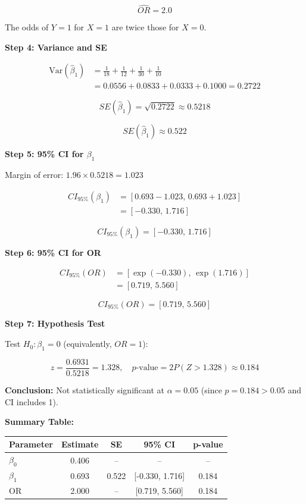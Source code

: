 \begin{solution}
\[
\boxed{\widehat{OR} = 2.0}
\]

The odds of $Y=1$ for $X=1$ are twice those for $X=0$.

\textbf{Step 4: Variance and SE}

\begin{align*}
\text{Var}(\hat{\beta}_1) &= \frac{1}{18} + \frac{1}{12} + \frac{1}{30} + \frac{1}{10} \\
&= 0.0556 + 0.0833 + 0.0333 + 0.1000 = 0.2722
\end{align*}

\[
SE(\hat{\beta}_1) = \sqrt{0.2722} \approx 0.5218
\]

\[
\boxed{SE(\hat{\beta}_1) \approx 0.522}
\]

\textbf{Step 5: 95\% CI for $\beta_1$}

Margin of error: $1.96 \times 0.5218 = 1.023$

\begin{align*}
CI_{95\%}(\beta_1) &= [0.693 - 1.023, \, 0.693 + 1.023] \\
&= [-0.330, \, 1.716]
\end{align*}

\[
\boxed{CI_{95\%}(\beta_1) = [-0.330, \, 1.716]}
\]

\textbf{Step 6: 95\% CI for OR}

\begin{align*}
CI_{95\%}(OR) &= [\exp(-0.330), \, \exp(1.716)] \\
&= [0.719, \, 5.560]
\end{align*}

\[
\boxed{CI_{95\%}(OR) = [0.719, \, 5.560]}
\]

\textbf{Step 7: Hypothesis Test}

Test $H_0: \beta_1 = 0$ (equivalently, $OR = 1$):

\[
z = \frac{0.6931}{0.5218} = 1.328, \quad p\text{-value} = 2P(Z > 1.328) \approx 0.184
\]

\textbf{Conclusion:} Not statistically significant at $\alpha = 0.05$ (since $p = 0.184 > 0.05$ and CI includes 1).

\textbf{Summary Table:}

\begin{center}
\begin{tabular}{|l|c|c|c|c|}
\hline
\textbf{Parameter} & \textbf{Estimate} & \textbf{SE} & \textbf{95\% CI} & \textbf{p-value} \\
\hline
$\beta_0$ & 0.406 & -- & -- & -- \\
$\beta_1$ & 0.693 & 0.522 & [-0.330, 1.716] & 0.184 \\
OR & 2.000 & -- & [0.719, 5.560] & 0.184 \\
\hline
\end{tabular}
\end{center}
\end{solution}

